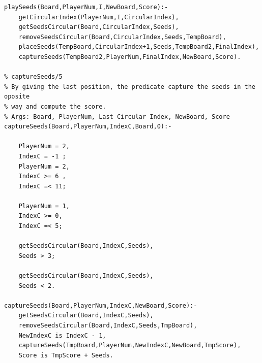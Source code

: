 \documentclass[15pt,a4paper]{article}
\begin{document}
\begin{verbatim}
playSeeds(Board,PlayerNum,I,NewBoard,Score):-
	getCircularIndex(PlayerNum,I,CircularIndex),
	getSeedsCircular(Board,CircularIndex,Seeds),
	removeSeedsCircular(Board,CircularIndex,Seeds,TempBoard),
	placeSeeds(TempBoard,CircularIndex+1,Seeds,TempBoard2,FinalIndex),
	captureSeeds(TempBoard2,PlayerNum,FinalIndex,NewBoard,Score).

% captureSeeds/5
% By giving the last position, the predicate capture the seeds in the oposite 
% way and compute the score.
% Args: Board, PlayerNum, Last Circular Index, NewBoard, Score
captureSeeds(Board,PlayerNum,IndexC,Board,0):-

	PlayerNum = 2,
	IndexC = -1 ; 
	PlayerNum = 2,
	IndexC >= 6 ,
	IndexC =< 11;
	
	PlayerNum = 1,
	IndexC >= 0,
	IndexC =< 5;
	
	getSeedsCircular(Board,IndexC,Seeds),
	Seeds > 3;
	
	getSeedsCircular(Board,IndexC,Seeds),
	Seeds < 2.
	
captureSeeds(Board,PlayerNum,IndexC,NewBoard,Score):-
	getSeedsCircular(Board,IndexC,Seeds),
	removeSeedsCircular(Board,IndexC,Seeds,TmpBoard),	
	NewIndexC is IndexC - 1,
	captureSeeds(TmpBoard,PlayerNum,NewIndexC,NewBoard,TmpScore),
	Score is TmpScore + Seeds.
	
\end{verbatim}
\end{document}
